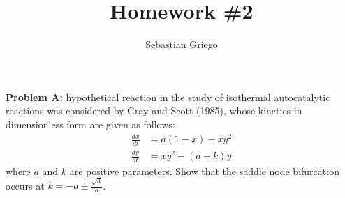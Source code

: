 \documentclass[12pt]{article}
\newenvironment{problem}[1]{
    \textbf{Problem #1:}
}{
    \rmfamily \vspace{1em}
}
\begin{document}
\title{Homework \#2}  %
\author{Sebastian Griego}  %

\begin{problem}{3}
    A hypothetical reaction in the study of isothermal autocatalytic reactions was considered by Gray and Scott (1985), whose kinetics in dimensionless form are given as follows:
    \[  
        \begin{aligned}
            \frac{dx}{dt} &= a(1-x)-xy^2\\
            \frac{dy}{dt} &= xy^2 - (a+k)y
        \end{aligned}
    \]
    where \(a\) and \(k\) are positive parameters. Show that the saddle node bifurcation occurs at \(k = -a \pm \frac{\sqrt{a}}{a}\).
\end{problem}
\end{document}
